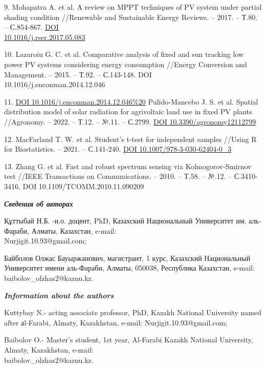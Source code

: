 \begin{references}
9. Mohapatra A. et al. A review on MPPT techniques of PV system under
partial shading condition //Renewable and Sustainable Energy Reviews.
-- 2017. -- Т.80. -- С.854-867.
\href{https://doi.org/10.1016/j.rser.2017.05.083}{DOI \\10.1016/j.rser.2017.05.083}

10. Lazaroiu G. C. et al. Comparative analysis of fixed and sun
tracking low power PV systems considering energy consumption //Energy
Conversion and Management. -- 2015. -- Т.92. -- С.143-148. DOI \\10.1016/j.enconman.2014.12.046

11. \href{https://doi.org/10.1016/j.enconman.2014.12.046\%20}{DOI 10.1016/j.enconman.2014.12.046\%20}
Pulido-Mancebo J. S. et al. Spatial distribution model of solar
radiation for agrivoltaic land use in fixed PV plants //Agronomy. --
2022. -- Т.12. -- №.11. -- С.2799.
\href{https://doi.org/10.3390/agronomy12112799}{DOI 10.3390/agronomy12112799}

12. MacFarland T. W. et al. Student's t-test for independent samples
//Using R for Biostatistics. -- 2021. -- С.141-240.
\href{https://doi.org/10.1007/978-3-030-62404-0_3}{DOI 10.1007/978-3-030-62404-0\_3}

13. Zhang G. et al. Fast and robust spectrum sensing via
Kolmogorov-Smirnov test //IEEE Transactions on Communications. --
2010. -- Т.58. -- №.12. -- С.3410-3416.
DOI 10.1109/TCOMM.2010.11.090209
\end{references}

\begin{authorinfo}
\hspace{1em}\emph{{\bfseries Сведения об авторах}}

Құттыбай Н.Б. -и.о. доцент, PhD, Казахский Национальный Университет
им. аль-Фараби, Алматы, Казахстан, e-mail: \\Nurjigit.10.93@gmail.com;

Байболов Олжас Бауыржанович, магистрант, 1 курс, Казахский
Национальный Университет имени аль-Фараби, Алматы, 050038, Республика
Казахстан, e-mail: baibolov\_olzhas2@kaznu.kz.

\hspace{1em}\emph{{\bfseries Information about the authors}}

Kuttybay N.- acting associate professor, PhD, Kazakh National
University named after аl-Farabi, Almaty, Kazakhstan, e-mail:
Nurjigit.10.93@gmail.com;

Baibolov O.- Master's student, 1st year, Al-Farabi Kazakh National
University, Almaty, Kazakhstan, e-mail: \\baibolov\_olzhas2@kaznu.kz.
\end{authorinfo}
